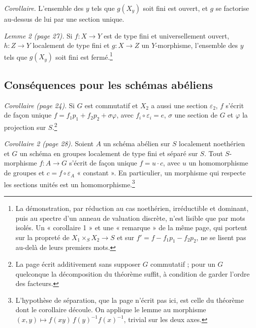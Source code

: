 \documentclass[11pt,a4paper]{article}
\begin{document}

\emph{Corollaire.} L'ensemble des $y$ tels que $g(X_y)$ soit fini est ouvert, et
$g$ se factorise au-dessus de lui par une section unique.

\emph{Lemme 2 (page 27).} Si $f \colon X \to Y$ est de type fini et
universellement ouvert, $h \colon Z \to Y$ localement de type fini et
$g \colon X \to Z$ un $Y$-morphisme, l'ensemble des $y$ tels que $g(X_y)$ soit
fini est fermé.\footnote{La démonstration, par réduction au cas noethérien,
irréductible et dominant, puis au spectre d'un anneau de valuation discrète,
n'est lisible que par mots isolés. Un « corollaire 1 » et une « remarque » de
la même page, qui portent sur la propreté de $X_1 \times_S X_2 \to S$ et sur
$f' = f - f_1 p_1 - f_2 p_2$, ne se lisent pas au-delà de leurs premiers
mots.}

\subsection*{Conséquences pour les schémas abéliens}

\emph{Corollaire (page 24).} Si $G$ est commutatif et $X_2$ a aussi une section
$\varepsilon_2$, $f$ s'écrit de façon unique
$f = f_1 p_1 + f_2 p_2 + \sigma \varphi$, avec $f_i \circ \varepsilon_i = e$,
$\sigma$ une section de $G$ et $\varphi$ la projection sur $S$.\footnote{La
page écrit additivement sans supposer $G$ commutatif ; pour un $G$ quelconque
la décomposition du théorème suffit, à condition de garder l'ordre des
facteurs.}

\emph{Corollaire 2 (page 28).} Soient $A$ un schéma abélien sur $S$ localement
noethérien et $G$ un schéma en groupes localement de type fini et séparé sur
$S$. Tout $S$-morphisme $f \colon A \to G$ s'écrit de façon unique
$f = u \cdot c$, avec $u$ un homomorphisme de groupes et $c = f \circ \varepsilon_A$
« constant ». En particulier, un morphisme qui respecte les sections unités est
un homomorphisme.\footnote{L'hypothèse de séparation, que la page n'écrit pas
ici, est celle du théorème dont le corollaire découle. On applique le lemme au
morphisme $(x, y) \mapsto f(xy)\,f(y)^{-1} f(x)^{-1}$, trivial sur les deux
axes.}
\end{document}

